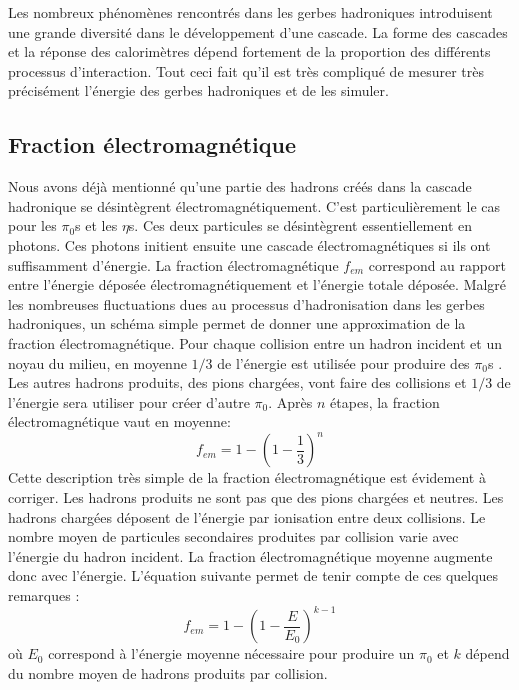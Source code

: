 Les nombreux phénomènes rencontrés dans les gerbes hadroniques introduisent une grande diversité dans le développement d'une cascade. La forme des cascades et la réponse des calorimètres dépend fortement de la proportion des différents processus d'interaction. Tout ceci fait qu'il est très compliqué de mesurer très précisément l'énergie des gerbes hadroniques et de les simuler. 

\subsection{Fraction électromagnétique}
Nous avons déjà mentionné qu'une partie des hadrons créés dans la cascade hadronique se désintègrent électromagnétiquement. C'est particulièrement le cas pour les $\pi_0$s et les $\eta$s. Ces deux particules se désintègrent essentiellement en photons. Ces photons initient ensuite une cascade électromagnétiques si ils ont suffisamment d'énergie. La fraction électromagnétique $f_{em}$ correspond au rapport entre l'énergie déposée électromagnétiquement et l'énergie totale déposée. Malgré les nombreuses fluctuations dues au processus d'hadronisation dans les gerbes hadroniques, un schéma simple permet de donner une approximation de la fraction électromagnétique. Pour chaque collision entre un hadron incident et un noyau du milieu, en moyenne $1/3$ de l'énergie est utilisée pour produire des $\pi_0$s \cite{Gabriel}. Les autres hadrons produits, des pions chargées, vont faire des collisions et $1/3$ de l'énergie sera utiliser pour créer d'autre $\pi_0$. Après $n$ étapes, la fraction électromagnétique vaut en moyenne:
\begin{equation}
  f_{em}=1-(1-\frac{1}{3})^n
\end{equation}
Cette description très simple de la fraction électromagnétique est évidement à corriger. Les hadrons produits ne sont pas que des pions chargées et neutres. Les hadrons chargées déposent de l'énergie par ionisation entre deux collisions. Le nombre moyen de particules secondaires produites par collision varie avec l'énergie du hadron incident. La fraction électromagnétique moyenne augmente donc avec l'énergie. L'équation suivante permet de tenir compte de ces quelques remarques \cite{Gabriel}:
\begin{equation}
  f_{em}=1-(1-\frac{E}{E_0})^{k-1}
\end{equation}
où $E_0$ correspond à l’énergie moyenne nécessaire pour produire un $\pi_0$ et $k$ dépend du nombre moyen de hadrons produits par collision. 

